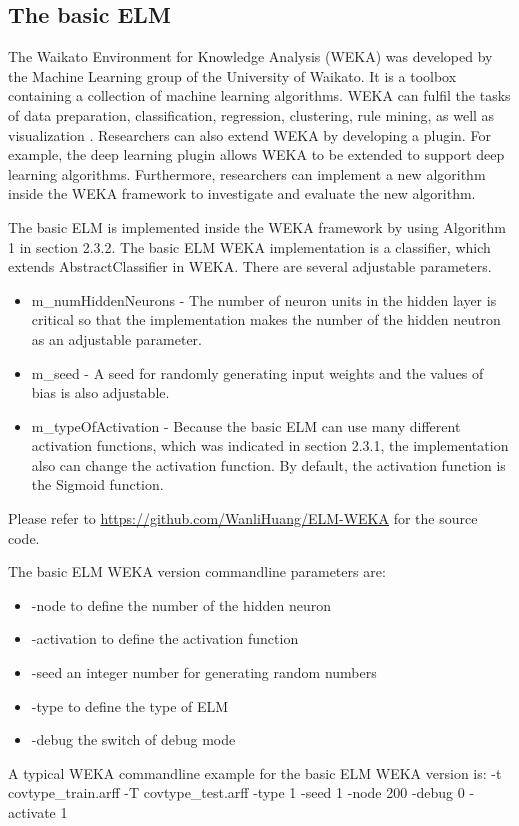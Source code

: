 \documentclass[a4paper, 14pt]{extarticle}
\begin{document}
\subsection{The basic ELM} 
\par The Waikato Environment for Knowledge Analysis (WEKA) was developed by the Machine Learning group of the University of Waikato. It is a toolbox containing a collection of machine learning algorithms. WEKA can fulfil the tasks of data preparation, classification, regression, clustering, rule mining, as well as visualization \cite{hall2009weka}. Researchers can also extend WEKA by developing a plugin. For example, the deep learning plugin allows WEKA to be extended to support deep learning algorithms. Furthermore, researchers can implement a new algorithm inside the WEKA framework to investigate and evaluate the new algorithm. 
\par The basic ELM is implemented inside the WEKA framework by using Algorithm 1 in section 2.3.2. The basic ELM WEKA implementation is a classifier, which extends AbstractClassifier in WEKA. There are several adjustable parameters. 
\begin{itemize}

\item m\_numHiddenNeurons - The number of neuron units in the hidden layer is critical so that the implementation makes the number of the hidden neutron as an adjustable parameter. 
\item m\_seed - A seed for randomly generating input weights and the values of bias is also adjustable. 
\item m\_typeOfActivation - Because the basic ELM can use many different activation functions, which was indicated in section 2.3.1, the implementation also can change the activation function. By default, the activation function is the Sigmoid function. 
    
\end{itemize}
Please refer to \url{https://github.com/WanliHuang/ELM-WEKA} for the source code. 

\par The basic ELM WEKA version commandline parameters are:
\begin{itemize}
    \item -node  to define the number of the hidden neuron
    \item -activation to define the activation function
    \item -seed  an integer number for generating random numbers
    \item -type to define the type of ELM
    \item -debug the switch of debug mode 
\end{itemize}
A typical WEKA commandline example for the basic ELM WEKA version is:\newline\newline
-t covtype\_train.arff -T covtype\_test.arff -type 1 -seed 1  -node 200 -debug 0 -activate 1
\end{document}
